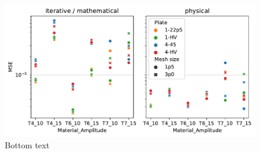 \begin{figure}
    \centering
    \includegraphics[width=\textwidth]{Chapter/05_results/figures/para3_vs_para5.pdf}
    \caption{Bottom text}
    \label{fig:para3_vs_para5}
\end{figure}